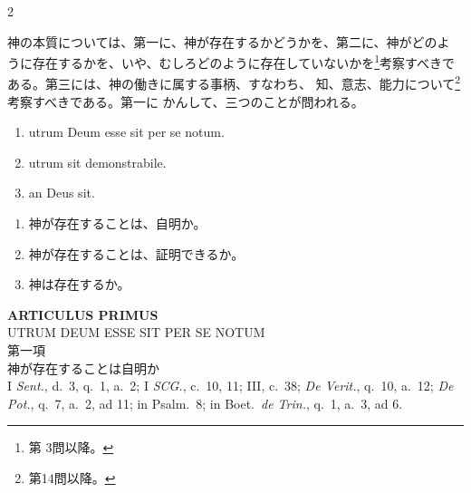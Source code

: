 \documentclass[paper=a4paper,fontsize=10pt,jafontsize=9pt,titlepage]{jlreq}
\begin{document}
\begin{paracol}{2}
\switchcolumn

神の本質については、第一に、神が存在するかどうかを、第二に、神がどのよ
うに存在するかを、いや、むしろどのように存在していないかを\footnote{第
3問以降。}考察すべきである。第三には、神の働きに属する事柄、すなわち、
知、意志、能力について\footnote{第14問以降。}考察すべきである。第一に
かんして、三つのことが問われる。

\switchcolumn*

\begin{enumerate}
 \item utrum Deum esse sit per se notum. 
 \item utrum sit demonstrabile. 
 \item an Deus sit.
\end{enumerate}

\switchcolumn

\begin{enumerate}
 \item 神が存在することは、自明か。
 \item 神が存在することは、証明できるか。 
 \item 神は存在するか。
\end{enumerate}

\end{paracol}

\newpage
{}
{}
\setcounter{section}{1}
\setcounter{subsection}{0}

\begin{center}
 {\Large {\bfseries ARTICULUS PRIMUS}}\\
 {\large UTRUM  DEUM ESSE SIT PER SE NOTUM}\\
 {\Large 第一項\\神が存在することは自明か}\\
 {\footnotesize I {\itshape Sent.}, d.~3, q.~1, a.~2; I {\itshape SCG.}, c.~10, 11;
 III, c.~38; {\itshape De Verit.}, q.~10, a.~12; {\itshape De Pot.}, q.~7, a.~2,
 ad 11; in Psalm.~8; in Boet.~{\itshape de Trin.}, q.~1, a.~3, ad 6.}

\end{center}
\end{document}
